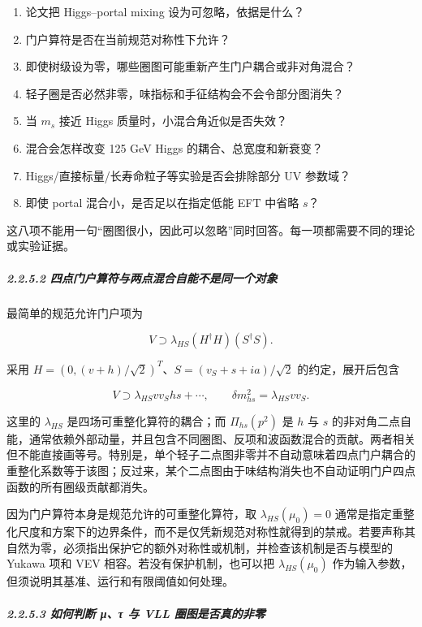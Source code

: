\documentclass[
]{article}
\providecommand{\tightlist}{%
  \setlength{\itemsep}{0pt}\setlength{\parskip}{0pt}}
\begin{document}
\begin{enumerate}
\def\labelenumi{\arabic{enumi}.}
\tightlist
\item
  论文把 Higgs--portal mixing 设为可忽略，依据是什么？
\item
  门户算符是否在当前规范对称性下允许？
\item
  即使树级设为零，哪些圈图可能重新产生门户耦合或非对角混合？
\item
  轻子圈是否必然非零，味指标和手征结构会不会令部分图消失？
\item
  当 \(m_s\) 接近 Higgs 质量时，小混合角近似是否失效？
\item
  混合会怎样改变 125 GeV Higgs 的耦合、总宽度和新衰变？
\item
  Higgs/直接标量/长寿命粒子等实验是否会排除部分 UV 参数域？
\item
  即使 portal 混合小，是否足以在指定低能 EFT 中省略 \(s\)？
\end{enumerate}

这八项不能用一句``圈图很小，因此可以忽略''同时回答。每一项都需要不同的理论或实验证据。

\subparagraph{2.2.5.2
四点门户算符与两点混合自能不是同一个对象}\label{ux56dbux70b9ux95e8ux6237ux7b97ux7b26ux4e0eux4e24ux70b9ux6df7ux5408ux81eaux80fdux4e0dux662fux540cux4e00ux4e2aux5bf9ux8c61}

最简单的规范允许门户项为

\[V\supset\lambda_{HS}(H^\dagger H)(S^\dagger S).\]

采用 \(H=(0,(v+h)/\sqrt2)^T\)、\(S=(v_S+s+ia)/\sqrt2\)
的约定，展开后包含

\[V\supset\lambda_{HS}vv_S hs+\cdots,\qquad \delta m_{hs}^2=\lambda_{HS}vv_S.\]

这里的 \(\lambda_{HS}\) 是四场可重整化算符的耦合；而 \(\Pi_{hs}(p^2)\)
是 \(h\) 与 \(s\)
的非对角二点自能，通常依赖外部动量，并且包含不同圈图、反项和波函数混合的贡献。两者相关但不能直接画等号。特别是，单个轻子二点图非零并不自动意味着四点门户耦合的重整化系数等于该图；反过来，某个二点图由于味结构消失也不自动证明门户四点函数的所有圈级贡献都消失。

因为门户算符本身是规范允许的可重整化算符，取 \(\lambda_{HS}(\mu_0)=0\)
通常是指定重整化尺度和方案下的边界条件，而不是仅凭新规范对称性就得到的禁戒。若要声称其自然为零，必须指出保护它的额外对称性或机制，并检查该机制是否与模型的
Yukawa 项和 VEV 相容。若没有保护机制，也可以把 \(\lambda_{HS}(\mu_0)\)
作为输入参数，但须说明其基准、运行和有限阈值如何处理。

\subparagraph{2.2.5.3 如何判断 μ、τ 与 VLL
圈图是否真的非零}\label{ux5982ux4f55ux5224ux65ad-ux3bcux3c4-ux4e0e-vll-ux5708ux56feux662fux5426ux771fux7684ux975eux96f6}
\end{document}
